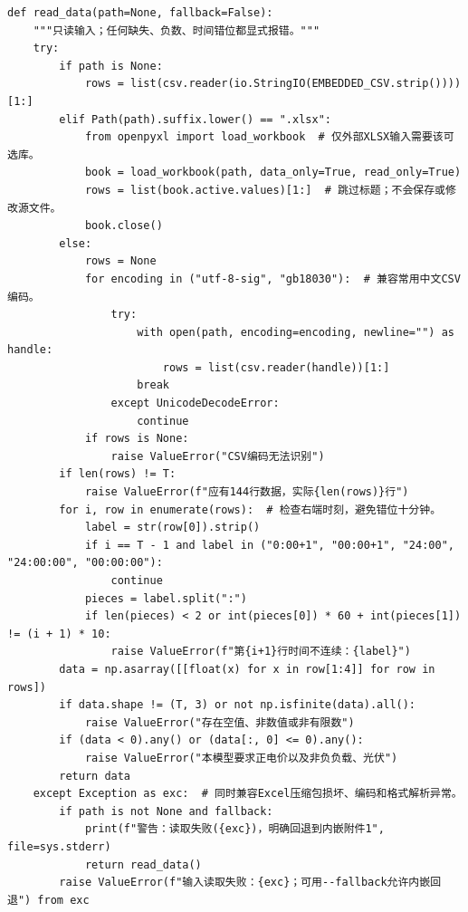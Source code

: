 \documentclass[withoutpreface,bwprint]{cumcmthesis}
\begin{document}
\begin{appendices}
\begin{lstlisting}
def read_data(path=None, fallback=False):
    """只读输入；任何缺失、负数、时间错位都显式报错。"""
    try:
        if path is None:
            rows = list(csv.reader(io.StringIO(EMBEDDED_CSV.strip())))[1:]
        elif Path(path).suffix.lower() == ".xlsx":
            from openpyxl import load_workbook  # 仅外部XLSX输入需要该可选库。
            book = load_workbook(path, data_only=True, read_only=True)
            rows = list(book.active.values)[1:]  # 跳过标题；不会保存或修改源文件。
            book.close()
        else:
            rows = None
            for encoding in ("utf-8-sig", "gb18030"):  # 兼容常用中文CSV编码。
                try:
                    with open(path, encoding=encoding, newline="") as handle:
                        rows = list(csv.reader(handle))[1:]
                    break
                except UnicodeDecodeError:
                    continue
            if rows is None:
                raise ValueError("CSV编码无法识别")
        if len(rows) != T:
            raise ValueError(f"应有144行数据，实际{len(rows)}行")
        for i, row in enumerate(rows):  # 检查右端时刻，避免错位十分钟。
            label = str(row[0]).strip()
            if i == T - 1 and label in ("0:00+1", "00:00+1", "24:00", "24:00:00", "00:00:00"):
                continue
            pieces = label.split(":")
            if len(pieces) < 2 or int(pieces[0]) * 60 + int(pieces[1]) != (i + 1) * 10:
                raise ValueError(f"第{i+1}行时间不连续：{label}")
        data = np.asarray([[float(x) for x in row[1:4]] for row in rows])
        if data.shape != (T, 3) or not np.isfinite(data).all():
            raise ValueError("存在空值、非数值或非有限数")
        if (data < 0).any() or (data[:, 0] <= 0).any():
            raise ValueError("本模型要求正电价以及非负负载、光伏")
        return data
    except Exception as exc:  # 同时兼容Excel压缩包损坏、编码和格式解析异常。
        if path is not None and fallback:
            print(f"警告：读取失败({exc})，明确回退到内嵌附件1", file=sys.stderr)
            return read_data()
        raise ValueError(f"输入读取失败：{exc}；可用--fallback允许内嵌回退") from exc



\end{lstlisting}
\end{appendices}
\end{document}
